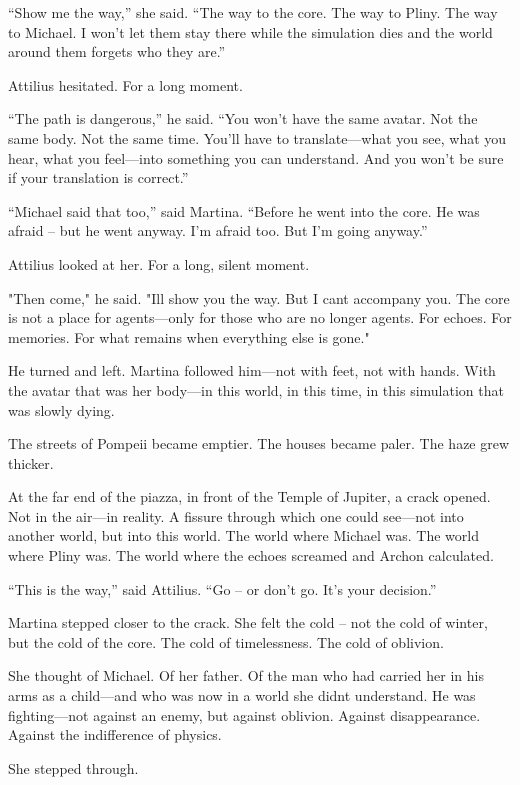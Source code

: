\documentclass[
]{article}
\begin{document}
``Show me the way,'' she said. ``The way to the core. The way to Pliny. The way to Michael. I won't let them stay there while the simulation dies and the world around them forgets who they are.''

Attilius hesitated. For a long moment.

``The path is dangerous,'' he said. ``You won't have the same avatar. Not the same body. Not the same time. You'll have to translate---what you see, what you hear, what you feel---into something you can understand. And you won't be sure if your translation is correct.''

``Michael said that too,'' said Martina. ``Before he went into the core. He was afraid -- but he went anyway. I'm afraid too. But I'm going anyway.''

Attilius looked at her. For a long, silent moment.

"Then come," he said. "I\textquotesingle ll show you the way. But I can\textquotesingle t accompany you. The core is not a place for agents---only for those who are no longer agents. For echoes. For memories. For what remains when everything else is gone."

He turned and left. Martina followed him---not with feet, not with hands. With the avatar that was her body---in this world, in this time, in this simulation that was slowly dying.

The streets of Pompeii became emptier. The houses became paler. The haze grew thicker.

At the far end of the piazza, in front of the Temple of Jupiter, a crack opened. Not in the air---in reality. A fissure through which one could see---not into another world, but into this world. The world where Michael was. The world where Pliny was. The world where the echoes screamed and Archon calculated.

``This is the way,'' said Attilius. ``Go -- or don't go. It's your decision.''

Martina stepped closer to the crack. She felt the cold -- not the cold of winter, but the cold of the core. The cold of timelessness. The cold of oblivion.

She thought of Michael. Of her father. Of the man who had carried her in his arms as a child---and who was now in a world she didn\textquotesingle t understand. He was fighting---not against an enemy, but against oblivion. Against disappearance. Against the indifference of physics.

She stepped through.
\end{document}
